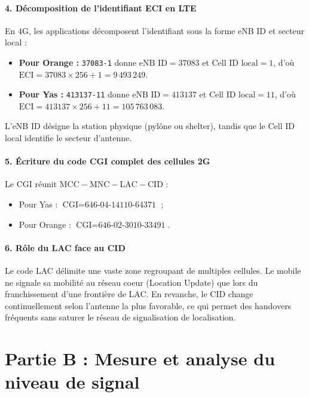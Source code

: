 \documentclass[11pt,a4paper]{article}
\begin{document}
\paragraph{4. D\'ecomposition de l'identifiant ECI en LTE}
En 4G, les applications d\'ecomposent l'identifiant sous la forme eNB ID et secteur local :
\begin{itemize}[noitemsep]
    \item \textbf{Pour Orange :} \texttt{37083-1} donne $\text{eNB ID} = 37083$ et $\text{Cell ID local} = 1$, d'o\`u $\text{ECI} = 37083 \times 256 + 1 = 9\,493\,249$.
    \item \textbf{Pour Yas :} \texttt{413137-11} donne $\text{eNB ID} = 413137$ et $\text{Cell ID local} = 11$, d'o\`u $\text{ECI} = 413137 \times 256 + 11 = 105\,763\,083$.
\end{itemize}
L'eNB ID d\'esigne la station physique (pyl\^one ou shelter), tandis que le Cell ID local identifie le secteur d'antenne.

\paragraph{5. \'Ecriture du code CGI complet des cellules 2G}
Le CGI r\'eunit $\text{MCC}-\text{MNC}-\text{LAC}-\text{CID}$ :
\begin{itemize}[noitemsep]
    \item Pour Yas : $\text{CGI} = \text{646-04-14110-64371}$ ;
    \item Pour Orange : $\text{CGI} = \text{646-02-3010-33491}$.
\end{itemize}

\paragraph{6. R\^ole du LAC face au CID}
Le code LAC d\'elimite une vaste zone regroupant de multiples cellules. Le mobile ne signale sa mobilit\'e au r\'eseau coeur (Location Update) que lors du franchissement d'une fronti\`ere de LAC. En revanche, le CID change continuellement selon l'antenne la plus favorable, ce qui permet des handovers fr\'equents sans saturer le r\'eseau de signalisation de localisation.

\newpage
\section{Partie B : Mesure et analyse du niveau de signal}
\end{document}
